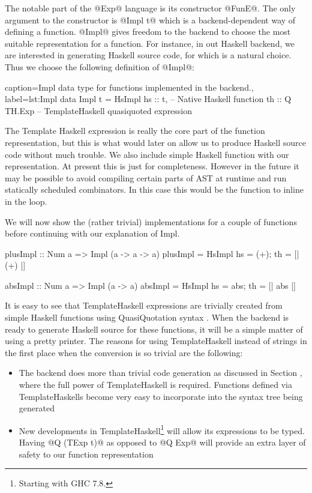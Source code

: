 \documentclass[preamble.tex]{subfiles}
\begin{document}


The notable part of the @Exp@ language is its constructor @FunE@. The only argument to the constructor is @Impl t@ which is a backend-dependent way of defining a function. @Impl@ gives freedom to the backend to choose the most suitable representation for a function. For instance, in out Haskell backend, we are interested in generating Haskell source code, for which   is a natural choice. Thus we choose the following definition of @Impl@:


\begin{hscode2}{%
    caption={Impl data type for functions implemented in the backend.},%
    label=lst:Impl}
data Impl t = HsImpl {
                hs :: t,        -- Native Haskell function
                th :: Q TH.Exp  -- TemplateHaskell quasiquoted expression
              } 
\end{hscode2}


The Template Haskell expression is really the core part of the function representation, but this is what would later on allow us to produce Haskell source code without much trouble. We also include simple Haskell function with our representation. At present this is just for completeness. However in the future it may be possible to avoid compiling certain parts of AST at runtime and run statically scheduled combinators. In this case this would be the function to inline in the loop.

We will now show the (rather trivial) implementations for a couple of functions before continuing with our explanation of Impl.

\begin{hscode}
plusImpl :: Num a => Impl (a -> a -> a)
plusImpl = HsImpl { hs = (+); th = [| (+) |] } 

absImpl :: Num a => Impl (a -> a)
absImpl = HsImpl { hs = abs; th = [| abs |] } 
\end{hscode}

It is easy to see that TemplateHaskell expressions are trivially created from simple Haskell functions using QuasiQuotation syntax . When the backend is ready to generate Haskell source for these functions, it will be a simple matter of using a pretty printer. The reasons for using TemplateHaskell instead of strings in the first place when the conversion is so trivial are the following:
\begin{itemize}
\item The backend does more than trivial code generation as discussed in Section , where the full power of TemplateHaskell is required. Functions defined via TemplateHaskells become very easy to incorporate into the syntax tree being generated
\item New developments in TemplateHaskell\footnote{Starting with GHC 7.8.} will allow its expressions to be typed. Having @Q (TExp t)@ as opposed to @Q Exp@ will provide an extra layer of safety to our function representation
\end{itemize}
\end{document}
